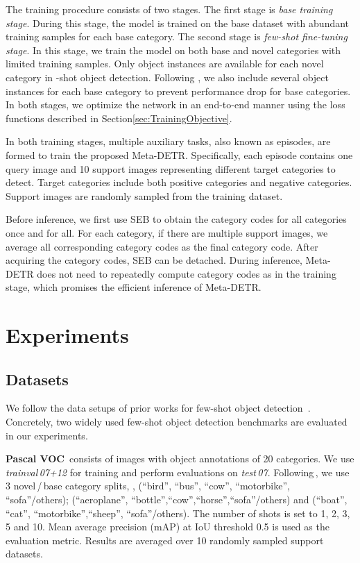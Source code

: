 \documentclass[10pt,twocolumn,letterpaper]{article}
\begin{document}
The training procedure consists of two stages.
The first stage is \textit{base training stage}. During this stage, the model is trained on the base dataset  with abundant training samples for each base category.
The second stage is \textit{few-shot fine-tuning stage}. In this stage, we train the model on both base and novel categories with limited training samples. Only  object instances are available for each novel category in -shot object detection. Following \cite{fsdet,metarcnn,FSDetView}, we also include several object instances for each base category to prevent performance drop for base categories.
In both stages, we optimize the network in an end-to-end manner using the loss functions described in Section\;\ref{sec:TrainingObjective}. 

In both training stages, multiple auxiliary tasks, also known as episodes, are formed to train the proposed Meta-DETR. Specifically, each episode contains one query image and 10 support images representing different target categories to detect. Target categories include both positive categories and negative categories. Support images are randomly sampled from the training dataset.

Before inference, we first use SEB to obtain the category codes for all categories once and for all. For each category, if there are multiple support images, we average all corresponding category codes as the final category code. After acquiring the category codes, SEB can be detached. During inference, Meta-DETR does not need to repeatedly compute category codes as in the training stage, which promises the efficient inference of Meta-DETR.


\section{Experiments}

\subsection{Datasets}

We follow the data setups of prior works for few-shot object detection~\cite{FewshotReweighting,metadet,metarcnn,fsdet,FSDetView,MPSR}. Concretely, two widely used few-shot object detection benchmarks are evaluated in our experiments.

\smallskip
\textbf{Pascal VOC\,\cite{PascalVOC}}
consists of images with object annotations of 20 categories. We use \textit{trainval\,07+12} for training and perform evaluations on \textit{test\,07}. Following\,\cite{FewshotReweighting,metarcnn,fsdet,FSDetView}, we use 3 novel\,/\,base category splits, \ie, (“bird”, “bus”, “cow”, “motorbike”, “sofa”\;/\;others); (“aeroplane”, “bottle”,“cow”,“horse”,“sofa”\;/\;others) and (“boat”, “cat”, “motorbike”,“sheep”, “sofa”\;/\;others). The number of shots is set to 1, 2, 3, 5 and 10.  Mean average precision (mAP) at IoU threshold 0.5 is used as the evaluation metric. Results are averaged over 10 randomly sampled support datasets. 
\end{document}
